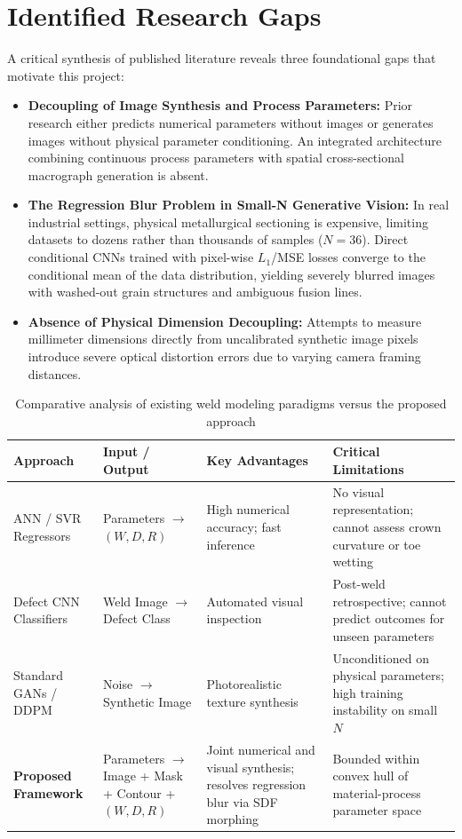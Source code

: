 \documentclass[12pt,a4paper,oneside]{report}
\begin{document}
\section{Identified Research Gaps}
A critical synthesis of published literature reveals three foundational gaps that motivate this project:
\begin{itemize}
    \item \textbf{Decoupling of Image Synthesis and Process Parameters:} Prior research either predicts numerical parameters without images or generates images without physical parameter conditioning. An integrated architecture combining continuous process parameters with spatial cross-sectional macrograph generation is absent.
    \item \textbf{The Regression Blur Problem in Small-N Generative Vision:} In real industrial settings, physical metallurgical sectioning is expensive, limiting datasets to dozens rather than thousands of samples ($N=36$). Direct conditional CNNs trained with pixel-wise $L_1$/MSE losses converge to the conditional mean of the data distribution, yielding severely blurred images with washed-out grain structures and ambiguous fusion lines.
    \item \textbf{Absence of Physical Dimension Decoupling:} Attempts to measure millimeter dimensions directly from uncalibrated synthetic image pixels introduce severe optical distortion errors due to varying camera framing distances.
\end{itemize}

\begin{table}[htbp]\centering
\caption{Comparative analysis of existing weld modeling paradigms versus the proposed approach}\label{tab:lit_comparison}
\small
\begin{tabular}{@{}lp{}p{}p{}@{}}
\toprule
\textbf{Approach} & \textbf{Input / Output} & \textbf{Key Advantages} & \textbf{Critical Limitations}\\ \midrule
ANN / SVR Regressors \cite{annp, dnnp} & Parameters $\to$ $(W, D, R)$ & High numerical accuracy; fast inference & No visual representation; cannot assess crown curvature or toe wetting\\
Defect CNN Classifiers \cite{eren2026, miao2021} & Weld Image $\to$ Defect Class & Automated visual inspection & Post-weld retrospective; cannot predict outcomes for unseen parameters\\
Standard GANs / DDPM \cite{cao2026, cheng2026} & Noise $\to$ Synthetic Image & Photorealistic texture synthesis & Unconditioned on physical parameters; high training instability on small $N$\\
\textbf{Proposed Framework} & Parameters $\to$ Image + Mask + Contour + $(W, D, R)$ & Joint numerical and visual synthesis; resolves regression blur via SDF morphing & Bounded within convex hull of material-process parameter space\\
\bottomrule
\end{tabular}
\end{table}
\end{document}
